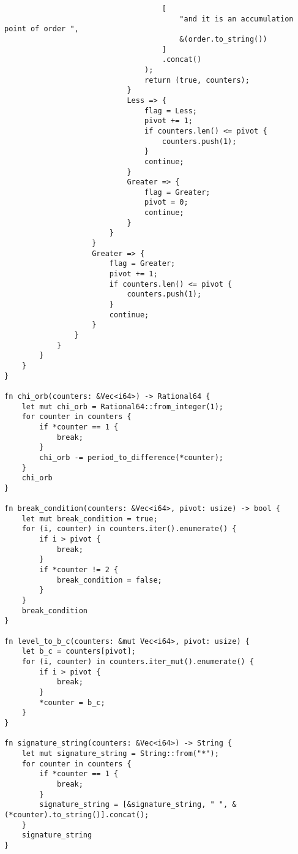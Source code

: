 \begin{lstlisting}
                                    [
                                        "and it is an accumulation point of order ",
                                        &(order.to_string())
                                    ]
                                    .concat()
                                );
                                return (true, counters);
                            }
                            Less => {
                                flag = Less;
                                pivot += 1;
                                if counters.len() <= pivot {
                                    counters.push(1);
                                }
                                continue;
                            }
                            Greater => {
                                flag = Greater;
                                pivot = 0;
                                continue;
                            }
                        }
                    }
                    Greater => {
                        flag = Greater;
                        pivot += 1;
                        if counters.len() <= pivot {
                            counters.push(1);
                        }
                        continue;
                    }
                }
            }
        }
    }
}

fn chi_orb(counters: &Vec<i64>) -> Rational64 {
    let mut chi_orb = Rational64::from_integer(1);
    for counter in counters {
        if *counter == 1 {
            break;
        }
        chi_orb -= period_to_difference(*counter);
    }
    chi_orb
}

fn break_condition(counters: &Vec<i64>, pivot: usize) -> bool {
    let mut break_condition = true;
    for (i, counter) in counters.iter().enumerate() {
        if i > pivot {
            break;
        }
        if *counter != 2 {
            break_condition = false;
        }
    }
    break_condition
}

fn level_to_b_c(counters: &mut Vec<i64>, pivot: usize) {
    let b_c = counters[pivot];
    for (i, counter) in counters.iter_mut().enumerate() {
        if i > pivot {
            break;
        }
        *counter = b_c;
    }
}

fn signature_string(counters: &Vec<i64>) -> String {
    let mut signature_string = String::from("*");
    for counter in counters {
        if *counter == 1 {
            break;
        }
        signature_string = [&signature_string, " ", &(*counter).to_string()].concat();
    }
    signature_string
}


\end{lstlisting}
